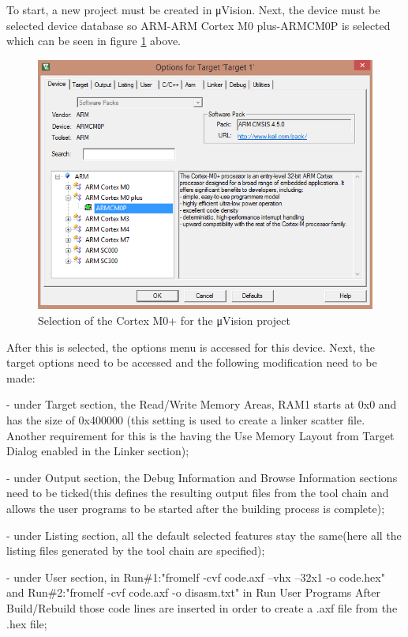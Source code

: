 To start, a new project must be created in μVision. Next, the device must be selected device database so ARM-ARM Cortex M0 plus-ARMCM0P is selected which can be seen in figure \ref{fig:armcm0p} above.
\begin{figure}
\centering
\includegraphics[scale=0.7]{figures/armcm0p.PNG}
\caption{Selection of the Cortex M0+ for the μVision project} 
\label{fig:armcm0p}
\end{figure}

After this is selected, the options menu is accessed for this device. Next, the target options need to be accessed and the following modification need to be made:

- under Target section, the Read/Write Memory Areas, RAM1 starts at 0x0 and has the size of 0x400000 (this setting is used to create a linker scatter file. Another requirement for this is the having the Use Memory Layout from Target Dialog enabled in the Linker section);

- under Output section, the Debug Information and Browse Information sections need to be ticked(this defines the resulting output files from the tool chain and allows the user programs to be started after the building process is complete);

- under Listing section, all the default selected features stay the same(here all the listing files generated by the tool chain are specified);

- under User section, in Run\#1:"fromelf -cvf code.axf --vhx --32x1 -o code.hex" and Run\#2:"fromelf -cvf code.axf -o disasm.txt" in Run User Programs After Build/Rebuild those code lines are inserted in order to create a .axf file from the .hex file;

